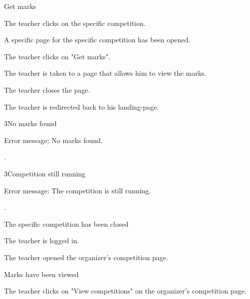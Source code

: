 \begin{uc}{Get marks}

    \begin{uc-mss}
    \item The teacher clicks on the specific competition.
    \item A specific page for the specific competition has been opened.
    \item The teacher clicks on "Get marks".
    \item The teacher is taken to a page that allows him to view the marks.
    \item The teacher closes the page.
    \item The teacher is redirected back to his landing-page.
    \end{uc-mss}

    \begin{uc-ext}

        \begin{uc-fail}{3}{No marks found}
        \item Error message: No marks found.
        \item {}.
        \end{uc-fail}

    \begin{uc-fail}{3}{Competition still running}
    \item Error message: The competition is still running.
    \item {}.
    \end{uc-fail}

    \end{uc-ext}

    \begin{uc-pre}
    \item The specific competition has been closed
        \item The teacher is logged in.
        \item The teacher opened the organizer's competition page.
    \end{uc-pre}

    \begin{uc-post}
    \item Marks have been viewed
    \end{uc-post}

    \begin{uc-trig}
        The teacher clicks on "View competitions" on the organizer's competition page.
    \end{uc-trig}

\end{uc}
